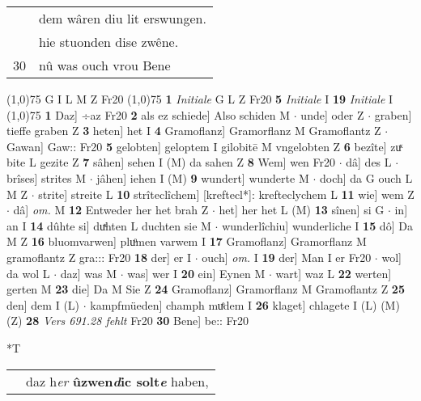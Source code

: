 \documentclass[8pt,a4paper,notitlepage]{article}
\begin{document}
\begin{table}[ht]
\begin{minipage}[t]{0.5\linewidth}
\begin{tabular}{rl}
 & dem wâren diu lit erswungen.\\ 
 & hie stuonden dise zwêne.\\ 
30 & nû was ouch vrou Bene\\ 
\end{tabular}
\scriptsize
\line(1,0){75} \newline
G I L M Z Fr20 \newline
\line(1,0){75} \newline
\textbf{1} \textit{Initiale} G L Z Fr20  \textbf{5} \textit{Initiale} I  \textbf{19} \textit{Initiale} I  \newline
\line(1,0){75} \newline
\textbf{1} Daz] ÷az Fr20 \textbf{2} als ez schiede] Also schiden M  $\cdot$ unde] oder Z  $\cdot$ graben] tieffe graben Z \textbf{3} heten] het I \textbf{4} Gramoflanz] Gramorflanz M Gramoflantz Z  $\cdot$ Gawan] Gaw:: Fr20 \textbf{5} gelobten] geloptem I gilobitē M vngelobten Z \textbf{6} bezîte] zuͯ bite L gezite Z \textbf{7} sâhen] sehen I (M) da sahen Z \textbf{8} Wem] wen Fr20  $\cdot$ dâ] des L  $\cdot$ brîses] strites M  $\cdot$ jâhen] iehen I (M) \textbf{9} wundert] wunderte M  $\cdot$ doch] da G ouch L M Z  $\cdot$ strite] streite L \textbf{10} strîteclîchem] [kreftecl*]: krefteclychem L \textbf{11} wie] wem Z  $\cdot$ dâ] \textit{om.} M \textbf{12} Entweder her het brah Z  $\cdot$ het] her het L (M) \textbf{13} sînen] si G  $\cdot$ in] an I \textbf{14} dûhte si] duͯhten L duchten sie M  $\cdot$ wunderlîchiu] wunderliche I \textbf{15} dô] Da M Z \textbf{16} bluomvarwen] pluͦmen varwem I \textbf{17} Gramoflanz] Gramorflanz M gramoflantz Z gra::: Fr20 \textbf{18} der] er I  $\cdot$ ouch] \textit{om.} I \textbf{19} der] Man I er Fr20  $\cdot$ wol] da wol L  $\cdot$ daz] was M  $\cdot$ was] wer I \textbf{20} ein] Eynen M  $\cdot$ wart] waz L \textbf{22} werten] gerten M \textbf{23} die] Da M Sie Z \textbf{24} Gramoflanz] Gramorflanz M Gramoflantz Z \textbf{25} den] dem I (L)  $\cdot$ kampfmüeden] champh muͤdem I \textbf{26} klaget] chlagete I (L) (M) (Z) \textbf{28} \textit{Vers 691.28 fehlt} Fr20  \textbf{30} Bene] be:: Fr20 \newline
\end{minipage}
\hspace{0.5cm}
\begin{minipage}[t]{0.5\linewidth}
\small
\begin{center}*T
\end{center}
\begin{tabular}{rl}
 & daz h\textit{er} \textbf{ûzwen\textit{d}ic solt\textit{e}} haben,\\ 

\end{tabular}
\end{minipage}
\end{table}
\end{document}
